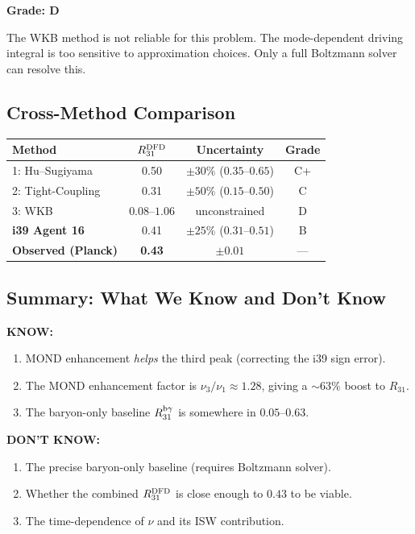 \documentclass[11pt,a4paper]{article}
\begin{document}

\textbf{Grade: D}

The WKB method is not reliable for this problem. The mode-dependent driving integral is too sensitive to approximation choices. Only a full Boltzmann solver can resolve this.

\subsection{Cross-Method Comparison}

\begin{center}
\begin{tabular}{lccc}
\toprule
\textbf{Method} & \textbf{$R_{31}^{\rm DFD}$} & \textbf{Uncertainty} & \textbf{Grade} \\
\midrule
1: Hu--Sugiyama & 0.50 & $\pm 30\%$ ($0.35$--$0.65$) & C+ \\
2: Tight-Coupling & 0.31 & $\pm 50\%$ ($0.15$--$0.50$) & C \\
3: WKB & $0.08$--$1.06$ & unconstrained & D \\
\midrule
\textbf{i39 Agent 16} & 0.41 & $\pm 25\%$ ($0.31$--$0.51$) & B \\
\textbf{Observed (Planck)} & \textbf{0.43} & $\pm 0.01$ & --- \\
\bottomrule
\end{tabular}
\end{center}

\subsection{Summary: What We Know and Don't Know}

\textbf{KNOW:}
\begin{enumerate}
\item MOND enhancement \emph{helps} the third peak (correcting the i39 sign error).
\item The MOND enhancement factor is $\nu_3/\nu_1 \approx 1.28$, giving a $\sim 63\%$ boost to $R_{31}$.
\item The baryon-only baseline $R_{31}^{\rm b\gamma}$ is somewhere in $0.05$--$0.63$.
\end{enumerate}

\textbf{DON'T KNOW:}
\begin{enumerate}
\item The precise baryon-only baseline (requires Boltzmann solver).
\item Whether the combined $R_{31}^{\rm DFD}$ is close enough to $0.43$ to be viable.
\item The time-dependence of $\nu$ and its ISW contribution.
\end{enumerate}
\end{document}
